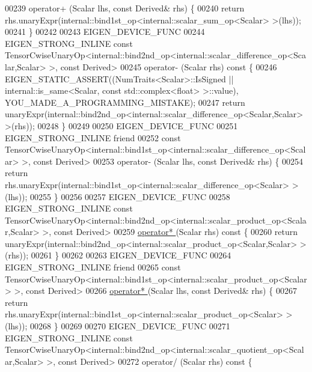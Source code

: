 \begin{DoxyCode}
00239     operator+ (Scalar lhs, \textcolor{keyword}{const} Derived& rhs) \{
00240       \textcolor{keywordflow}{return} rhs.unaryExpr(internal::bind1st\_op<internal::scalar\_sum\_op<Scalar> >(lhs));
00241     \}
00242 
00243     EIGEN\_DEVICE\_FUNC
00244     EIGEN\_STRONG\_INLINE \textcolor{keyword}{const} 
      TensorCwiseUnaryOp<internal::bind2nd\_op<internal::scalar\_difference\_op<Scalar,Scalar> >, \textcolor{keyword}{const} Derived>
00245     operator- (Scalar rhs)\textcolor{keyword}{ const }\{
00246       EIGEN\_STATIC\_ASSERT((NumTraits<Scalar>::IsSigned || internal::is\_same<Scalar, \textcolor{keyword}{const} 
      std::complex<float> >::value), YOU\_MADE\_A\_PROGRAMMING\_MISTAKE);
00247       \textcolor{keywordflow}{return} unaryExpr(internal::bind2nd\_op<internal::scalar\_difference\_op<Scalar,Scalar> >(rhs));
00248     \}
00249 
00250     EIGEN\_DEVICE\_FUNC
00251     EIGEN\_STRONG\_INLINE \textcolor{keyword}{friend}
00252     \textcolor{keyword}{const} TensorCwiseUnaryOp<internal::bind1st\_op<internal::scalar\_difference\_op<Scalar> >, \textcolor{keyword}{const} Derived>
00253     operator- (Scalar lhs, \textcolor{keyword}{const} Derived& rhs) \{
00254       \textcolor{keywordflow}{return} rhs.unaryExpr(internal::bind1st\_op<internal::scalar\_difference\_op<Scalar> >(lhs));
00255     \}
00256 
00257     EIGEN\_DEVICE\_FUNC
00258     EIGEN\_STRONG\_INLINE \textcolor{keyword}{const} 
      TensorCwiseUnaryOp<internal::bind2nd\_op<internal::scalar\_product\_op<Scalar,Scalar> >, \textcolor{keyword}{const} Derived>
00259     \hyperlink{namespace_eigen_a32970f7eb62fe31eeefee72d24a046d0}{operator* }(Scalar rhs)\textcolor{keyword}{ const }\{
00260       \textcolor{keywordflow}{return} unaryExpr(internal::bind2nd\_op<internal::scalar\_product\_op<Scalar,Scalar> >(rhs));
00261     \}
00262 
00263     EIGEN\_DEVICE\_FUNC
00264     EIGEN\_STRONG\_INLINE \textcolor{keyword}{friend}
00265     \textcolor{keyword}{const} TensorCwiseUnaryOp<internal::bind1st\_op<internal::scalar\_product\_op<Scalar> >, \textcolor{keyword}{const} Derived>
00266     \hyperlink{namespace_eigen_a32970f7eb62fe31eeefee72d24a046d0}{operator* }(Scalar lhs, \textcolor{keyword}{const} Derived& rhs) \{
00267       \textcolor{keywordflow}{return} rhs.unaryExpr(internal::bind1st\_op<internal::scalar\_product\_op<Scalar> >(lhs));
00268     \}
00269 
00270     EIGEN\_DEVICE\_FUNC
00271     EIGEN\_STRONG\_INLINE \textcolor{keyword}{const} 
      TensorCwiseUnaryOp<internal::bind2nd\_op<internal::scalar\_quotient\_op<Scalar,Scalar> >, \textcolor{keyword}{const} Derived>
00272     operator/ (Scalar rhs)\textcolor{keyword}{ const }\{

\end{DoxyCode}

